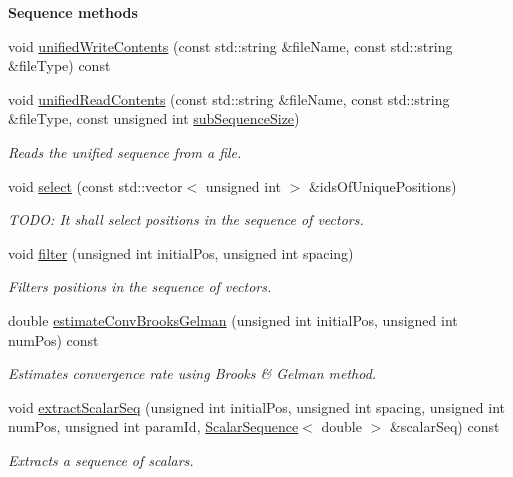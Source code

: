 \begin{Indent}{\bf Sequence methods}
\begin{DoxyCompactItemize}
void \hyperlink{class_q_u_e_s_o_1_1_sequence_of_vectors_a19f46ad2f88402913e7ed1357ae6b6a8}{unified\-Write\-Contents} (const std\-::string \&file\-Name, const std\-::string \&file\-Type) const 
\item 
void \hyperlink{class_q_u_e_s_o_1_1_sequence_of_vectors_af463a5a9b5cf846b73fb5c54f59d574b}{unified\-Read\-Contents} (const std\-::string \&file\-Name, const std\-::string \&file\-Type, const unsigned int \hyperlink{class_q_u_e_s_o_1_1_sequence_of_vectors_a0224bd3e961d86af5d2886301c0c2b86}{sub\-Sequence\-Size})
\begin{DoxyCompactList}\small\item\em Reads the unified sequence from a file. \end{DoxyCompactList}\item 
void \hyperlink{class_q_u_e_s_o_1_1_sequence_of_vectors_a8094ca3dd6addf572728a88a987168ab}{select} (const std\-::vector$<$ unsigned int $>$ \&ids\-Of\-Unique\-Positions)
\begin{DoxyCompactList}\small\item\em T\-O\-D\-O\-: It shall select positions in the sequence of vectors. \end{DoxyCompactList}\item 
void \hyperlink{class_q_u_e_s_o_1_1_sequence_of_vectors_aa826dc4cbb2607d2bc54144998d9fa01}{filter} (unsigned int initial\-Pos, unsigned int spacing)
\begin{DoxyCompactList}\small\item\em Filters positions in the sequence of vectors. \end{DoxyCompactList}\item 
double \hyperlink{class_q_u_e_s_o_1_1_sequence_of_vectors_aac49d62310d6db805e2075dd886b417a}{estimate\-Conv\-Brooks\-Gelman} (unsigned int initial\-Pos, unsigned int num\-Pos) const 
\begin{DoxyCompactList}\small\item\em Estimates convergence rate using Brooks \& Gelman method. \end{DoxyCompactList}\item 
void \hyperlink{class_q_u_e_s_o_1_1_sequence_of_vectors_ac977b3b26a6af2ae727671f1246262fd}{extract\-Scalar\-Seq} (unsigned int initial\-Pos, unsigned int spacing, unsigned int num\-Pos, unsigned int param\-Id, \hyperlink{class_q_u_e_s_o_1_1_scalar_sequence}{Scalar\-Sequence}$<$ double $>$ \&scalar\-Seq) const 
\begin{DoxyCompactList}\small\item\em Extracts a sequence of scalars. \end{DoxyCompactList}\end{DoxyCompactItemize}
\end{Indent}
